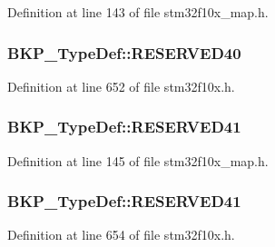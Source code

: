 Definition at line 143 of file stm32f10x\+\_\+map.\+h.

\subsubsection[{\texorpdfstring{R\+E\+S\+E\+R\+V\+E\+D40}{RESERVED40}}]{ B\+K\+P\+\_\+\+Type\+Def\+::\+R\+E\+S\+E\+R\+V\+E\+D40}\hypertarget{struct_b_k_p___type_def_ad2a0438e85f576fb2f86d6451f1801b3}{}\label{struct_b_k_p___type_def_ad2a0438e85f576fb2f86d6451f1801b3}


Definition at line 652 of file stm32f10x.\+h.

\subsubsection[{\texorpdfstring{R\+E\+S\+E\+R\+V\+E\+D41}{RESERVED41}}]{ B\+K\+P\+\_\+\+Type\+Def\+::\+R\+E\+S\+E\+R\+V\+E\+D41}\hypertarget{struct_b_k_p___type_def_a580f8324383d400136e28f9c1a7edc9b}{}\label{struct_b_k_p___type_def_a580f8324383d400136e28f9c1a7edc9b}


Definition at line 145 of file stm32f10x\+\_\+map.\+h.

\subsubsection[{\texorpdfstring{R\+E\+S\+E\+R\+V\+E\+D41}{RESERVED41}}]{ B\+K\+P\+\_\+\+Type\+Def\+::\+R\+E\+S\+E\+R\+V\+E\+D41}\hypertarget{struct_b_k_p___type_def_acc7168a69e4540fe45541c9bcb013cd5}{}\label{struct_b_k_p___type_def_acc7168a69e4540fe45541c9bcb013cd5}


Definition at line 654 of file stm32f10x.\+h.

